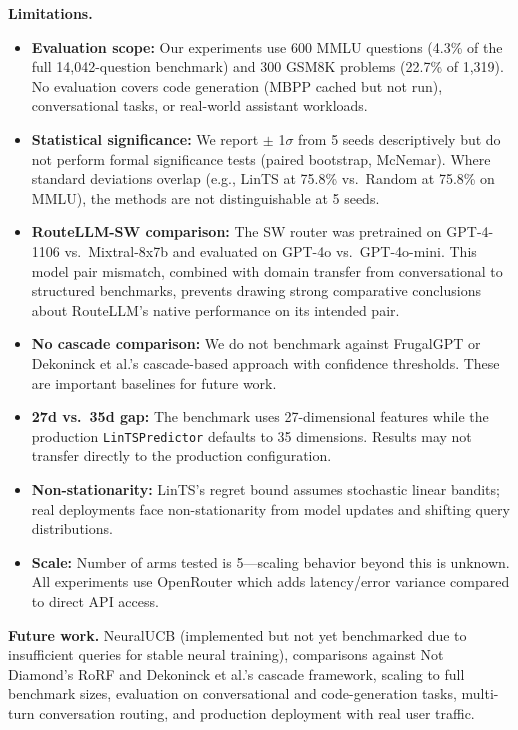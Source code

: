 \documentclass[11pt]{article}
\begin{document}
\textbf{Limitations.}
\begin{itemize}
    \item \textbf{Evaluation scope:} Our experiments use 600 MMLU questions (4.3\% of the full 14,042-question benchmark) and 300 GSM8K problems (22.7\% of 1,319). No evaluation covers code generation (MBPP cached but not run), conversational tasks, or real-world assistant workloads.
    \item \textbf{Statistical significance:} We report $\pm$ 1$\sigma$ from 5 seeds descriptively but do not perform formal significance tests (paired bootstrap, McNemar). Where standard deviations overlap (e.g., LinTS at 75.8\% vs.\ Random at 75.8\% on MMLU), the methods are not distinguishable at 5 seeds.
    \item \textbf{RouteLLM-SW comparison:} The SW router was pretrained on GPT-4-1106 vs.\ Mixtral-8x7b and evaluated on GPT-4o vs.\ GPT-4o-mini. This model pair mismatch, combined with domain transfer from conversational to structured benchmarks, prevents drawing strong comparative conclusions about RouteLLM's native performance on its intended pair.
    \item \textbf{No cascade comparison:} We do not benchmark against FrugalGPT or Dekoninck et al.'s cascade-based approach with confidence thresholds. These are important baselines for future work.
    \item \textbf{27d vs.\ 35d gap:} The benchmark uses 27-dimensional features while the production \texttt{LinTSPredictor} defaults to 35 dimensions. Results may not transfer directly to the production configuration.
    \item \textbf{Non-stationarity:} LinTS's regret bound assumes stochastic linear bandits; real deployments face non-stationarity from model updates and shifting query distributions.
    \item \textbf{Scale:} Number of arms tested is 5---scaling behavior beyond this is unknown. All experiments use OpenRouter which adds latency/error variance compared to direct API access.
\end{itemize}

\textbf{Future work.} NeuralUCB (implemented but not yet benchmarked due to insufficient queries for stable neural training), comparisons against Not Diamond's RoRF and Dekoninck et al.'s cascade framework, scaling to full benchmark sizes, evaluation on conversational and code-generation tasks, multi-turn conversation routing, and production deployment with real user traffic.



\end{document}
